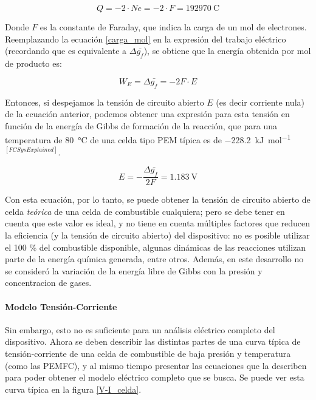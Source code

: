 \begin{equation}\label{carga_mol}
    Q=-2\cdot Ne=-2\cdot F=\SI{192970}{\coulomb}
\end{equation}

Donde $F$ es la constante de Faraday, que indica la carga de un mol de electrones.\\

Reemplazando la ecuación \ref{carga_mol} en la expresión del trabajo eléctrico (recordando que es equivalente a $\Delta\bar{g_f}$), se obtiene que la energía obtenida por mol de producto es:

\begin{equation}\label{trabajo_elec}
    W_E=\Delta\bar{g_f}=-2F\cdot E
\end{equation}

Entonces, si despejamos la tensión de circuito abierto $E$ (es decir corriente nula) de la ecuación anterior, podemos obtener una expresión para esta tensión en función de la energía de Gibbs de formación de la reacción, que para una temperatura de \SI{80}{\celsius} de una celda tipo PEM típica es de \SI{-228.2}{\kilo\joule\per\mole}$^{[FCSysExplained]}$.

\begin{equation}\label{tension_vacio}
    \boxed{E=-\frac{\Delta\bar{g_f}}{2F}=\SI{1.183}{\volt}}
\end{equation}

Con esta ecuación, por lo tanto, se puede obtener la {\Medium tensión de circuito abierto de celda} \textit{teórica} de una celda de combustible cualquiera; pero se debe tener en cuenta que este valor es ideal, y no tiene en cuenta múltiples factores que reducen la eficiencia (y la tensión de circuito abierto) del dispositivo: no es posible utilizar el 100 \% del combustible disponible, algunas dinámicas de las reacciones utilizan parte de la energía química generada, entre otros. Además, en este desarrollo no se consideró la variación de la energía libre de Gibbs con la presión y concentracion de gases.\\

\paragraph{Modelo Tensión-Corriente}

Sin embargo, esto no es suficiente para un análisis eléctrico completo del dispositivo. Ahora se deben describir las distintas partes de una curva típica de tensión-corriente de una celda de combustible de baja presión y temperatura (como las PEMFC), y al mismo tiempo presentar las ecuaciones que la describen para poder obtener el modelo eléctrico completo que se busca. Se puede ver esta curva típica en la figura \ref{V-I_celda}.

